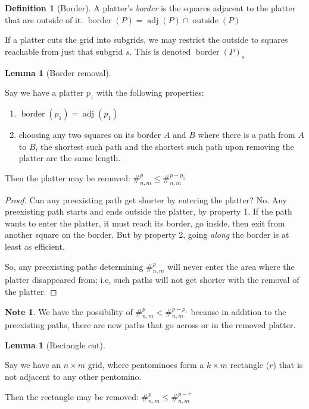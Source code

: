 \documentclass{article}
\theoremstyle{definition}%
\newtheorem{lemma}[theorem]{Lemma}
\newtheorem{definition}[theorem]{Definition}
\newtheorem*{note}{Note}
\newcommand{\newterm}[1]{\textit{#1}}
\newcommand{\adj}{\operatorname{adj}}
\newcommand{\border}{\operatorname{border}}
\newcommand{\outside}{\operatorname{outside}}
\begin{document}
\begin{definition}[Border]
A platter's \newterm{border} is the squares adjacent to the platter that are outside of it. $\border(P) = \adj(P) \cap \outside(P)$

If a platter cuts the grid into subgrids, we may restrict the outside to squares reachable from just that subgrid $s$. This is denoted $\border(P)_s$
\end{definition}

\begin{lemma}[Border removal]
\label{lem:Border removal}

Say we have a platter $p_1$ with the following properties:

\begin{enumerate}
\item $\border(p_1) = \adj(p_1)$
\item choosing any two squares on its border $A$ and $B$ where there is a path from $A$ to $B$, the shortest such path and the shortest such path upon removing the platter are the same length.
\end{enumerate}

Then the platter may be removed: $\#^{p}_{n, m} \le \#^{p - p_1}_{n, m}$
\end{lemma}

\begin{proof}
Can any preexisting path get shorter by entering the platter? No. Any preexisting path starts and ends outside the platter, by property 1. If the path wants to enter the platter, it must reach its border, go inside, then exit from another square on the border. But by property 2, going \emph{along} the border is at least as efficient.

So, any preexisting paths determining $\#^{p}_{n, m}$ will never enter the area where the platter disappeared from; i.e, such paths will not get shorter with the removal of the platter.
\end{proof}

\begin{note}
We have the possibility of $\#^{p}_{n, m} < \#^{p - p_1}_{n, m}$ because in addition to the preexisting paths, there are new paths that go across or in the removed platter.
\end{note}

\begin{lemma}[Rectangle cut]
\label{lem:Rectangle cut}

Say we have an $n \times m$ grid, where pentominoes form a $k \times m$ rectangle ($r$) that is not adjacent to any other pentomino.

Then the rectangle may be removed: $\#^{p}_{n, m} \le \#^{p - r}_{n, m}$
\end{lemma}
\end{document}
